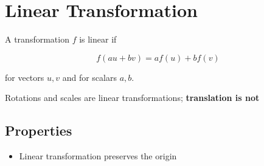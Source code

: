 \chapter{Linear Transformation}

A transformation $ f $ is linear if

\begin{equation}
  f\left( au + bv \right) = a f\left( u \right) + b f\left( v \right)
\end{equation}

for vectors $ u, v $ and for scalars $ a, b $.

Rotations and scales are linear transformations; \textbf{translation is not}

\section{Properties}

  \begin{itemize}
    \item Linear transformation preserves the origin
  \end{itemize}
